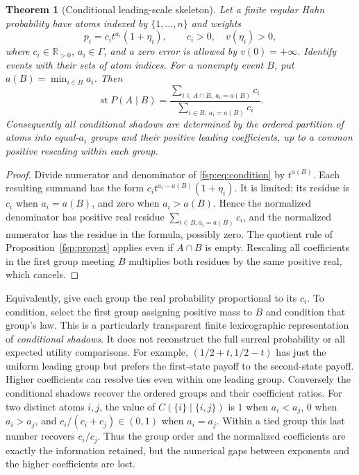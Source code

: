 \documentclass[11pt,a4paper]{article}
\numberwithin{equation}{section}
\newtheorem{theorem}{Theorem}[section]
\theoremstyle{definition}
\theoremstyle{remark}
\newcommand{\R}{\mathbb R}
\newcommand{\st}{\operatorname{st}}
\begin{document}
\begin{theorem}[Conditional leading-scale skeleton]\label{fsp:thm:skeleton}
Let a finite regular Hahn probability have atoms indexed by
$\{1,\ldots,n\}$ and weights
\begin{equation}
 p_i=c_i t^{a_i}(1+\eta_i),\qquad c_i>0,\quad v(\eta_i)>0,
\end{equation}
where $c_i\in\R_{>0}$, $a_i\in\Gamma$, and a zero error is allowed
by $v(0)=+\infty$. Identify events with their sets of atom indices.
For a nonempty event $B$, put $a(B)=\min_{i\in B}a_i$. Then
\begin{equation}\label{fsp:eq:skeleton}
 \st P(A\mid B)
 =\frac{\sum_{i\in A\cap B,\ a_i=a(B)}c_i}
        {\sum_{i\in B,\ a_i=a(B)}c_i}.
\end{equation}
Consequently all conditional shadows are determined by the ordered
partition of atoms into equal-$a_i$ groups and their positive leading
coefficients, up to a common positive rescaling within each group.
\end{theorem}
\begin{proof}
Divide numerator and denominator of \eqref{fsp:eq:condition} by
$t^{a(B)}$. Each resulting summand has the form
$c_i t^{a_i-a(B)}(1+\eta_i)$. It is limited: its residue is $c_i$
when $a_i=a(B)$, and zero when $a_i>a(B)$. Hence the normalized
denominator has positive real residue
$\sum_{i\in B,a_i=a(B)}c_i$, and the normalized numerator has the
residue in the formula, possibly zero. The quotient rule of
Proposition~\ref{fsp:prop:st} applies even if $A\cap B$ is empty.
Rescaling all coefficients in the first group meeting $B$ multiplies
both residues by the same positive real, which cancels.
\end{proof}

Equivalently, give each group the real probability proportional to its
$c_i$. To condition, select the first group assigning positive mass to
$B$ and condition that group's law. This is a particularly transparent
finite lexicographic representation of \emph{conditional shadows}.
It does not reconstruct the full surreal probability or all expected
utility comparisons. For example, $(1/2+t,1/2-t)$ has just the uniform
leading group but prefers the first-state payoff to the second-state
payoff. Higher coefficients can resolve ties even within one leading
group. Conversely the conditional shadows recover the ordered groups
and their coefficient ratios. For two distinct atoms $i,j$, the value of
$C(\{i\}\mid\{i,j\})$ is $1$ when $a_i<a_j$, $0$ when $a_i>a_j$,
and $c_i/(c_i+c_j)\in(0,1)$ when $a_i=a_j$. Within a tied group this
last number recovers $c_i/c_j$. Thus the group order and the normalized
coefficients are exactly the information retained, but the numerical gaps
between exponents and the higher coefficients are lost.
\end{document}
